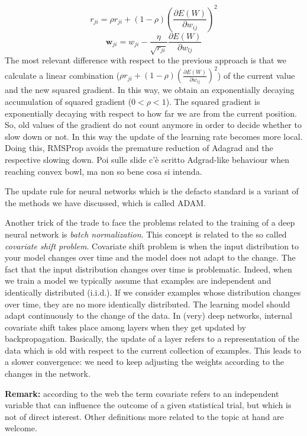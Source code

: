 $$r_{ji} = \rho r_{ji} + (1 - \rho) (\frac{\partial E(W)}{\partial w_{ij}})^2$$
$$\pmb{w}_{ji} = w_{ji} - \frac{\eta}{\sqrt{r_{ji}}} \frac{\partial E(W)}{\partial w_{lj}}$$
The most relevant difference with respect to the previous approach is that we calculate a linear combination ($\rho r_{ji} + (1 - \rho) (\frac{\partial E(W)}{\partial w_{ij}})^2$) of the current value and the new squared gradient. In this way, we obtain an exponentially decaying accumulation of squared gradient ($0<\rho<1$). The squared gradient is exponentially decaying with respect to how far we are from the current position. So, old values of the gradient do not count anymore in order to decide whether to slow down or not. In this way the update of the learning rate becomes more local. Doing this, RMSProp avoids the premature reduction of Adagrad and the respective slowing down. Poi sulle slide c'è scritto Adgrad-like behaviour when reaching convex bowl, ma non so bene cosa si intenda. \newline

The update rule for neural networks which is the defacto standard is a variant of the methods we have discussed, which is called ADAM. \newline

Another trick of the trade to face the problems related to the training of a deep neural network is \textit{batch normalization}. This concept is related to the so called \textit{covariate shift problem}. Covariate shift problem is when the input distribution to your model changes over time and the model does not adapt to the change. The fact that the input distribution changes over time is problematic. Indeed, when we train a model we typically assume that examples are independent and identically distributed (i.i.d.). If we consider examples whose distribution changes over time, they are no more identically distributed. The learning model should adapt continuously to the change of the data. In (very) deep networks, internal covariate shift takes place among layers when they get updated by backpropagation. Basically, the update of a layer refers to a representation of the data which is old with respect to the current collection of examples. This leads to a slower convergence: we need to keep adjusting the weights according to the changes in the network. \newline

\textbf{Remark:} according to the web the term covariate refers to an independent variable that can influence the outcome of a given statistical trial, but which is not of direct interest. Other definitions more related to the topic at hand are welcome. \newline

